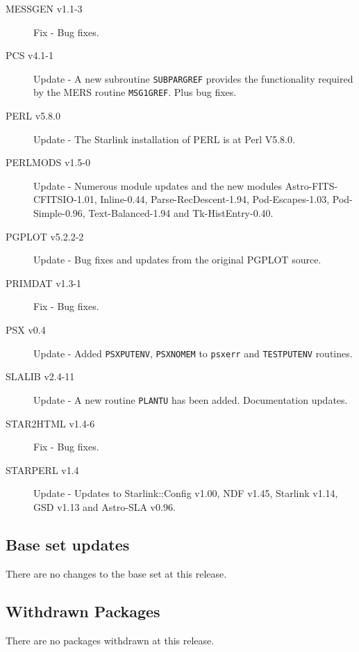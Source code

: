 \documentclass[twoside,11pt]{article}
\newcommand{\xlabel}[1]{}
\renewcommand{\_}{\texttt{\symbol{95}}}
\begin{document}
\begin{description}
\item[MESSGEN v1.1-3] Fix - Bug fixes.

\item[PCS v4.1-1] Update - A new subroutine \texttt{SUBPAR\_GREF} provides the functionality 
required by the MERS routine \texttt{MSG1\_GREF}. Plus bug fixes.

\item[PERL v5.8.0] Update - The Starlink installation of PERL is at Perl V5.8.0.

\item[PERLMODS v1.5-0] Update - Numerous module updates and the new modules
Astro-FITS-CFITSIO-1.01, Inline-0.44, Parse-RecDescent-1.94, Pod-Escapes-1.03,
Pod-Simple-0.96, Text-Balanced-1.94 and Tk-HistEntry-0.40.

\item[PGPLOT v5.2.2-2] Update - Bug fixes and updates from the original PGPLOT source. 

\item[PRIMDAT v1.3-1] Fix - Bug fixes.

\item[PSX v0.4] Update - Added \texttt{PSX\_PUTENV}, \texttt{PSX\_\_NOMEM} to \texttt{psx\_err} and
\texttt{TEST\_PUTENV} routines.

\item[SLALIB v2.4-11] Update - A new routine \texttt{PLANTU} has been added.
Documentation updates.

\item[STAR2HTML v1.4-6] Fix - Bug fixes.

\item[STARPERL v1.4] Update - Updates to Starlink::Config v1.00, NDF v1.45,
Starlink v1.14, GSD v1.13 and Astro-SLA v0.96.
\end{description}

\subsection{\xlabel{base_set_updates}Base set updates}
\label{base_set_updates}

There are no changes to the base set at this release.

\subsection{\xlabel{withdrawn_packages}Withdrawn Packages}
\label{withdrawn_packages}

There are no packages withdrawn at this release. 
\end{document}
